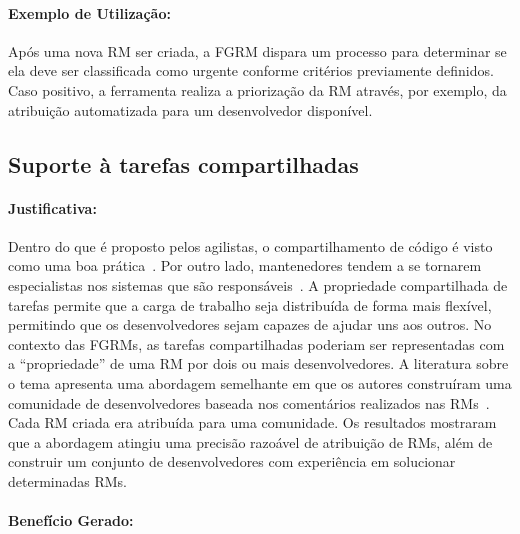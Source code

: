\paragraph{Exemplo de Utilização:}\label{par:exemplo_de_utilização_s07}

Após uma nova RM ser criada, a FGRM dispara um processo para determinar se ela
deve ser classificada como urgente conforme critérios previamente definidos.
Caso positivo, a ferramenta realiza a priorização da RM através, por exemplo,
da atribuição automatizada para um desenvolvedor disponível.

\subsection{Suporte à tarefas compartilhadas}\label{sub:suporte_tarefas_compartilhadas}


\paragraph{Justificativa:}\label{par:justificativa_s08}

Dentro do que é proposto pelos agilistas, o compartilhamento de código é visto
como uma boa prática~\cite{meyer2014agile}. Por outro lado, mantenedores tendem
a se tornarem especialistas nos sistemas que são
responsáveis~\cite{singer1998practices}. A propriedade compartilhada de tarefas
permite que a carga de trabalho seja distribuída de forma mais flexível,
permitindo que os desenvolvedores sejam capazes de ajudar uns aos outros. No
contexto das FGRMs, as tarefas compartilhadas poderiam ser representadas com a
``propriedade'' de uma RM por dois ou mais desenvolvedores. A literatura sobre
o tema apresenta uma abordagem semelhante em que os autores construíram uma
comunidade de desenvolvedores baseada nos comentários realizados nas
RMs~\cite{banitaan2013decoba}. Cada RM criada era atribuída para uma
comunidade. Os resultados mostraram que a abordagem atingiu uma precisão
razoável de atribuição de RMs, além de construir um conjunto de desenvolvedores
com experiência em solucionar determinadas RMs.

\paragraph{Benefício Gerado:}\label{par:papéis_afetados_s08}


